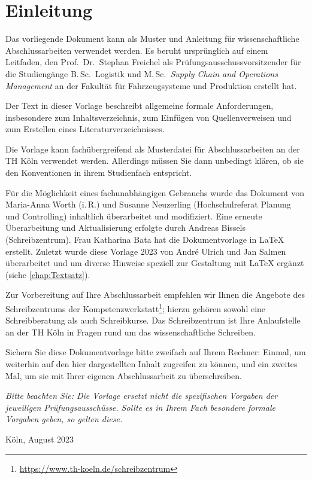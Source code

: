 \chapter*{Einleitung}
%
Das vorliegende Dokument kann als Muster und Anleitung für wissenschaftliche Abschlussarbeiten verwendet werden. Es beruht ursprünglich auf einem Leitfaden, den Prof.~Dr.~Stephan Freichel als Prüfungsausschussvorsitzender für die Studiengänge B.\,Sc.~Logistik und M.\,Sc.~\emph{Supply Chain and Operations Management} an der Fakultät für Fahrzeugsysteme und Produktion erstellt hat.
\par
Der Text in dieser Vorlage beschreibt allgemeine formale Anforderungen, insbesondere zum Inhaltsverzeichnis, zum Einfügen von Quellenverweisen und zum Erstellen eines Literaturverzeichnisses.
\par
Die Vorlage kann fachübergreifend als Musterdatei für Abschlussarbeiten an der TH Köln verwendet werden. Allerdings müssen Sie dann unbedingt klären, ob sie den Konventionen in ihrem Studienfach entspricht.
\par
Für die Möglichkeit eines fachunabhängigen Gebrauchs wurde das Dokument von Maria-Anna Worth (i.\,R.) und Susanne Neuzerling (Hochschulreferat Planung und Controlling) inhaltlich überarbeitet und modifiziert. Eine erneute Überarbeitung und Aktualisierung erfolgte durch Andreas Bissels (Schreibzentrum). Frau Katharina Bata hat die Dokumentvorlage in LaTeX erstellt. Zuletzt wurde diese Vorlage 2023 von André Ulrich und Jan Salmen überarbeitet und um diverse Hinweise speziell zur Gestaltung mit \LaTeX{} ergänzt (siehe \cref{chap:Textsatz}).
\par
Zur Vorbereitung auf Ihre Abschlussarbeit empfehlen wir Ihnen die Angebote des Schreibzentrums der Kompetenzwerkstatt\footnote{\href{https://www.th-koeln.de/schreibzentrum}{https://www.th-koeln.de/schreibzentrum}}; hierzu gehören sowohl eine Schreibberatung als auch Schreibkurse. Das Schreibzentrum ist Ihre Anlaufstelle an der TH Köln in Fragen rund um das wissenschaftliche Schreiben.
\par
Sichern Sie diese Dokumentvorlage bitte zweifach auf Ihrem Rechner: Einmal, um weiterhin auf den hier dargestellten Inhalt zugreifen zu können, und ein zweites Mal, um sie mit Ihrer eigenen Abschlussarbeit zu überschreiben.
\par
\emph{Bitte beachten Sie: Die Vorlage ersetzt nicht die spezifischen Vorgaben der jeweiligen Prüfungsausschüsse. Sollte es in Ihrem Fach besondere formale Vorgaben geben, so gelten diese.}\enlargethispage{\baselineskip}
%
\begin{flushright}
Köln, August 2023
\end{flushright}